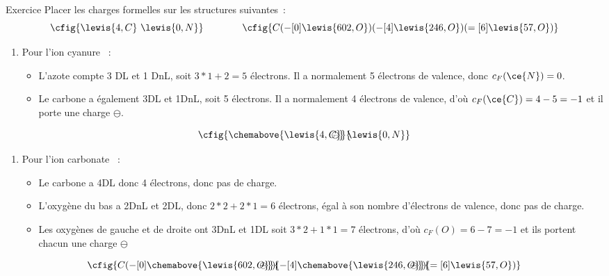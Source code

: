 \documentclass[../main/main.tex]{subfiles}
\begin{document}
\begin{rexem}{Exercice}
    Placer les charges formelles sur les structures suivantes~:
    \[
        \cfig{\lewis{4,C}~\lewis{0,N}}
        \qquad\qquad
        \cfig{
            C
            (-[0]\lewis{602,O})
            (-[4]\lewis{246,O})
            (=[6]\lewis{57,O})
        }
    \]
    \tcblower
    \begin{enumerate}
        \item Pour l'ion cyanure ~:
            \begin{itemize}[label=$\diamond$, leftmargin=10pt]
                \item L'azote compte 3 DL et 1 DnL, soit $3*1+2=5$ électrons. Il
                    a normalement 5 électrons de valence, donc $c_F(\ce{N}) =
                    0$.
                \item Le carbone a également 3DL et 1DnL, soit 5 électrons. Il a
                    normalement 4 électrons de valence, d'où $c_F(\ce{C}) = 4-5
                = -1$ et il porte une charge $\ominus$.
            \end{itemize}
    \end{enumerate} \smallbreak
    \[
        \cfig{\chemabove{\lewis{4,C}}{\hspace{-20pt}\ominus}~\lewis{0,N}}
    \]
    \begin{enumerate}[resume]
        \item Pour l'ion carbonate ~:
            \begin{itemize}[label=$\diamond$, leftmargin=10pt]
                \item Le carbone a 4DL donc 4 électrons, donc pas de charge.
                \item L'oxygène du bas a 2DnL et 2DL, donc $2*2+2*1=6$
                    électrons, égal à son nombre d'électrons de valence, donc
                    pas de charge.
                \item Les oxygènes de gauche et de droite ont 3DnL et 1DL soit
                    $3*2+1*1=7$ électrons, d'où $c_F(O) = 6-7 = -1$ et ils
                    portent chacun une charge $\ominus$
            \end{itemize}
    \end{enumerate} \smallbreak
    \[
        \cfig{
            C
            (-[0]\chemabove{\lewis{602,O}}{\hspace{-20pt}\ominus})
            (-[4]\chemabove{\lewis{246,O}}{\hspace{-20pt}\ominus})
            (=[6]\lewis{57,O})
        }
    \]
\end{rexem}
\end{document}
